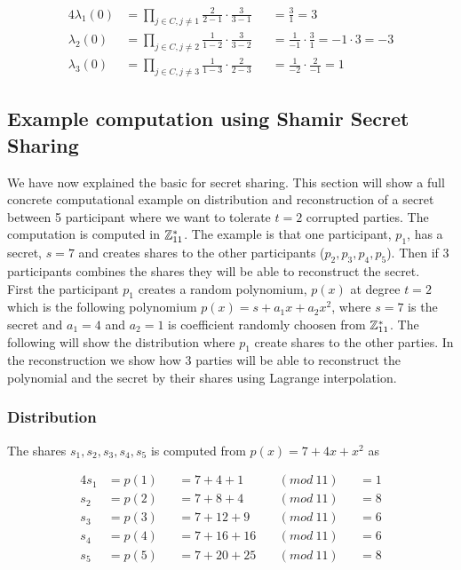 \noindent
\begin{alignat*}{4}
\lambda_1(0) &=\prod\limits_{j\in C,j\neq 1} \frac{2}{2-1}  \cdot  \frac{3}{3-1} &&=\frac{3}{1} = 3 \\
\lambda_2(0) &=\prod\limits_{j\in C,j\neq 2} \frac{1}{1-2}  \cdot  \frac{3}{3-2} &&=\frac{1}{-1} \cdot  \frac{3}{1} =-1 \cdot  3=-3 \\
\lambda_3(0) &=\prod\limits_{j\in C,j\neq 3} \frac{1}{1-3}  \cdot  \frac{2}{2-3} &&=\frac{1}{-2} \cdot  \frac{2}{-1} =1  
\end{alignat*}




 \subsection{Example computation using Shamir Secret Sharing}
We have now explained the basic for secret sharing. This section will show a full concrete computational example on distribution and reconstruction of a secret between 5 participant where we want to tolerate $t=2$ corrupted parties. The computation is computed in $\mathbb{Z}_{11}^*$. The example is that one participant, $p_1$, has a secret, $s=7$ and creates shares to the other participants ($p_2, p_3, p_4, p_5$). Then if $3$ participants combines the shares they will be able to reconstruct the secret. \\

\noindent
First the participant $p_1$ creates a random polynomium, $p(x)$ at degree $t=2$ which is the following polynomium $p(x)=s + a_{1}x+ a_{2}x^2$, where $s=7$ is the secret and $a_{1}=4$ and $a_{2}=1$ is coefficient randomly choosen from $\mathbb{Z}_{11}^*$. The following will show the distribution where $p_1$ create shares to the other parties. In the reconstruction we show how $3$ parties will be able to reconstruct the polynomial and the secret by their shares using Lagrange interpolation.   

\subsubsection{Distribution}
The shares $s_1, s_2, s_3, s_4,s_5$ is computed from $p(x)=7 + 4x+ x^2$ as

\noindent
\begin{alignat*}{4}
s_1&=p(1)&&= 7+4+1 \ &&(mod \ 11) &&=1 \\
s_2&=p(2)&&= 7+8+4 \ &&(mod \ 11) &&=8 \\
s_3&=p(3)&&= 7+12+9 \ &&(mod \ 11) &&=6 \\
s_4&=p(4)&&= 7+16+16 \ &&(mod \ 11) &&=6 \\
s_5&=p(5)&&= 7+20+25 \ &&(mod \ 11) &&=8    
\end{alignat*}


